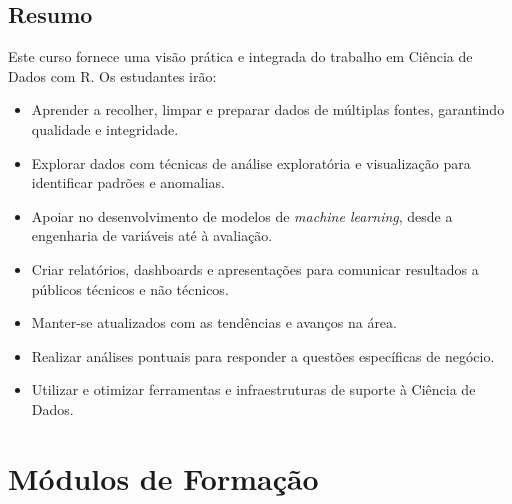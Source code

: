 \documentclass[12pt]{article}
\begin{document}
\vspace{0.5cm}


\subsection*{Resumo}
Este curso fornece uma visão prática e integrada do trabalho em Ciência de Dados com R. Os estudantes irão:
\begin{itemize}
    \item Aprender a recolher, limpar e preparar dados de múltiplas fontes, garantindo qualidade e integridade.
    \item Explorar dados com técnicas de análise exploratória e visualização para identificar padrões e anomalias.
    \item Apoiar no desenvolvimento de modelos de \textit{machine learning}, desde a engenharia de variáveis até à avaliação.
    \item Criar relatórios, dashboards e apresentações para comunicar resultados a públicos técnicos e não técnicos.
    \item Manter-se atualizados com as tendências e avanços na área.
    \item Realizar análises pontuais para responder a questões específicas de negócio.
    \item Utilizar e otimizar ferramentas e infraestruturas de suporte à Ciência de Dados.
\end{itemize}


\section*{Módulos de Formação}

%
\end{document}
